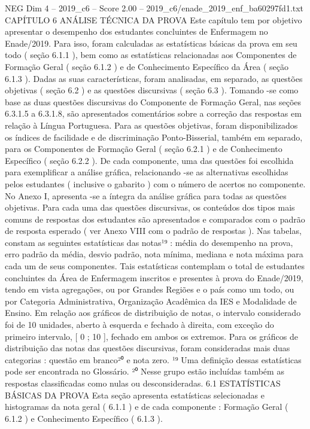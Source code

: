 \begin{textsample}{NEG Dim 4 – 2019\_c6 – Score 2.00 – 2019\_c6/enade\_2019\_enf\_ba60297fd1.txt}  \label{ex:f4_neg_264}
CAPÍTULO 6 ANÁLISE TÉCNICA DA PROVA Este capítulo tem por objetivo apresentar o desempenho dos estudantes concluintes de Enfermagem no Enade/2019.
Para isso, foram calculadas as estatísticas básicas da prova em seu todo ( seção 6.1.1 ), bem como as estatísticas relacionadas aos Componentes de Formação Geral ( seção 6.1.2 ) e de Conhecimento Específico da Área ( seção 6.1.3 ).
Dadas as suas características, foram analisadas, em separado, as questões objetivas ( seção 6.2 ) e as questões discursivas ( seção 6.3 ).
Tomando -se como base as duas questões discursivas do Componente de Formação Geral, nas seções 6.3.1.5 a 6.3.1.8, são apresentados comentários sobre a correção das respostas em relação à Língua Portuguesa.
Para as questões objetivas, foram disponibilizados os índices de facilidade e de discriminação Ponto-Bisserial, também em separado, para os Componentes de Formação Geral ( seção 6.2.1 ) e de Conhecimento Específico ( seção 6.2.2 ).
De cada componente, uma das questões foi escolhida para exemplificar a análise gráfica, relacionando -se as alternativas escolhidas pelos estudantes ( inclusive o gabarito ) com o número de acertos no componente.
No Anexo I, apresenta -se a íntegra da análise gráfica para todas as questões objetivas.
Para cada uma das questões discursivas, os conteúdos dos tipos mais comuns de respostas dos estudantes são apresentados e comparados com o padrão de resposta esperado ( ver Anexo VIII com o padrão de respostas ).
Nas tabelas, constam as seguintes estatísticas das notas¹⁹ : média do desempenho na prova, erro padrão da média, desvio padrão, nota mínima, mediana e nota máxima para cada um de seus componentes.
Tais estatísticas contemplam o total de estudantes concluintes da Área de Enfermagem inscritos e presentes à prova do Enade/2019, tendo em vista agregações, ou por Grandes Regiões e o país como um todo, ou por Categoria Administrativa, Organização Acadêmica da IES e Modalidade de Ensino.
Em relação aos gráficos de distribuição de notas, o intervalo considerado foi de 10 unidades, aberto à esquerda e fechado à direita, com exceção do primeiro intervalo, [ 0 ; 10 ], fechado em ambos os extremos.
Para os gráficos de distribuição das notas das questões discursivas, foram consideradas mais duas categorias : questão em branco²⁰ e nota zero. ¹⁹ Uma definição dessas estatísticas pode ser encontrada no Glossário. ²⁰ Nesse grupo estão incluídas também as respostas classificadas como nulas ou desconsideradas. 6.1 ESTATÍSTICAS BÁSICAS DA PROVA Esta seção apresenta estatísticas selecionadas e histogramas da nota geral ( 6.1.1 ) e de cada componente : Formação Geral ( 6.1.2 ) e Conhecimento Específico ( 6.1.3 ).

\end{textsample}

